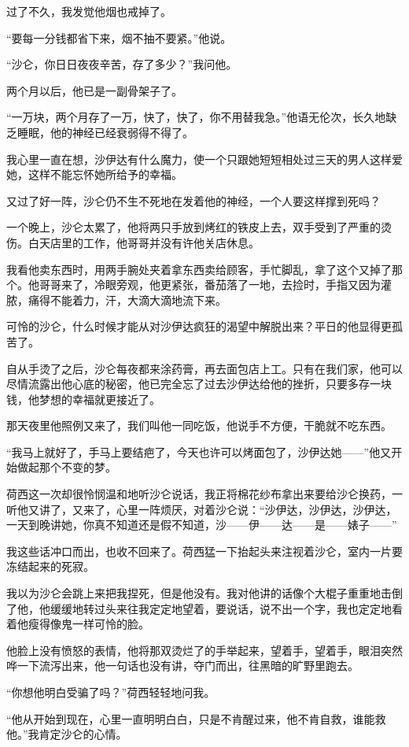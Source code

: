 \par 过了不久，我发觉他烟也戒掉了。
\par “要每一分钱都省下来，烟不抽不要紧。”他说。
\par “沙仑，你日日夜夜辛苦，存了多少？”我问他。
\par 两个月以后，他已是一副骨架子了。
\par “一万块，两个月存了一万，快了，快了，你不用替我急。”他语无伦次，长久地缺乏睡眠，他的神经已经衰弱得不得了。
\par 我心里一直在想，沙伊达有什么魔力，使一个只跟她短短相处过三天的男人这样爱她，这样不能忘怀她所给予的幸福。
\par 又过了好一阵，沙仑仍不生不死地在发着他的神经，一个人要这样撑到死吗？
\par 一个晚上，沙仑太累了，他将两只手放到烤红的铁皮上去，双手受到了严重的烫伤。白天店里的工作，他哥哥并没有许他关店休息。
\par 我看他卖东西时，用两手腕处夹着拿东西卖给顾客，手忙脚乱，拿了这个又掉了那个。他哥哥来了，冷眼旁观，他更紧张，番茄落了一地，去捡时，手指又因为灌脓，痛得不能着力，汗，大滴大滴地流下来。
\par 可怜的沙仑，什么时候才能从对沙伊达疯狂的渴望中解脱出来？平日的他显得更孤苦了。
\par 自从手烫了之后，沙仑每夜都来涂药膏，再去面包店上工。只有在我们家，他可以尽情流露出他心底的秘密，他已完全忘了过去沙伊达给他的挫折，只要多存一块钱，他梦想的幸福就更接近了。
\par 那天夜里他照例又来了，我们叫他一同吃饭，他说手不方便，干脆就不吃东西。
\par “我马上就好了，手马上要结疤了，今天也许可以烤面包了，沙伊达她——”他又开始做起那个不变的梦。
\par 荷西这一次却很怜悯温和地听沙仑说话，我正将棉花纱布拿出来要给沙仑换药，一听他又讲了，又来了，心里一阵烦厌，对着沙仑说：“沙伊达，沙伊达，沙伊达，一天到晚讲她，你真不知道还是假不知道，沙——伊——达——是——婊子——”
\par 我这些话冲口而出，也收不回来了。荷西猛一下抬起头来注视着沙仑，室内一片要冻结起来的死寂。
\par 我以为沙仑会跳上来把我捏死，但是他没有。我对他讲的话像个大棍子重重地击倒了他，他缓缓地转过头来往我定定地望着，要说话，说不出一个字，我也定定地看着他瘦得像鬼一样可怜的脸。
\par 他脸上没有愤怒的表情，他将那双烫烂了的手举起来，望着手，望着手，眼泪突然哗一下流泻出来，他一句话也没有讲，夺门而出，往黑暗的旷野里跑去。
\par “你想他明白受骗了吗？”荷西轻轻地问我。
\par “他从开始到现在，心里一直明明白白，只是不肯醒过来，他不肯自救，谁能救他。”我肯定沙仑的心情。
